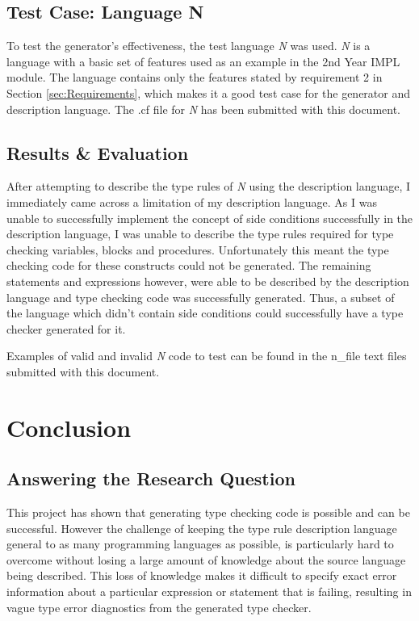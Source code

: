 \documentclass{UoYCSproject}
\begin{document}
\section{Test Case: Language N}
To test the generator's effectiveness, the test language \textit{N} was used.
\textit{N} is a language with a basic set of features used as an example in the 
2nd Year IMPL module. The language contains only the features stated by 
requirement 2 in Section \ref{sec:Requirements}, which makes it a good test case 
for the generator and description language. The {\ttfamily .cf} file for
\textit{N} has been submitted with this document.

\section{Results \& Evaluation}
After attempting to describe the type rules of \textit{N} using the description 
language, I immediately came across a limitation of my description language. 
As I was unable to successfully implement the concept of side conditions 
successfully in the description language, I was unable to describe the type rules 
required for type checking variables, blocks and procedures. 
Unfortunately this meant the type checking code for these constructs could not be 
generated. The remaining statements and expressions however, were able to be 
described by the description language and type checking code was successfully 
generated. Thus, a subset of the language which didn't contain side conditions 
could successfully have a type checker generated for it. 

Examples of valid and invalid \textit{N} code to test can be found in the 
{\ttfamily n\_file} text files submitted with this document.

\chapter{Conclusion}

\section{Answering the Research Question}
This project has shown that generating type checking code is possible and can
be successful. However the challenge of keeping the type rule description language
general to as many programming languages as possible, is particularly hard to
overcome without losing a large amount of knowledge about the source language
being described. This loss of knowledge makes it difficult to specify exact
error information about a particular expression or statement that is failing,
resulting in vague type error diagnostics from the generated type checker.
\end{document}
